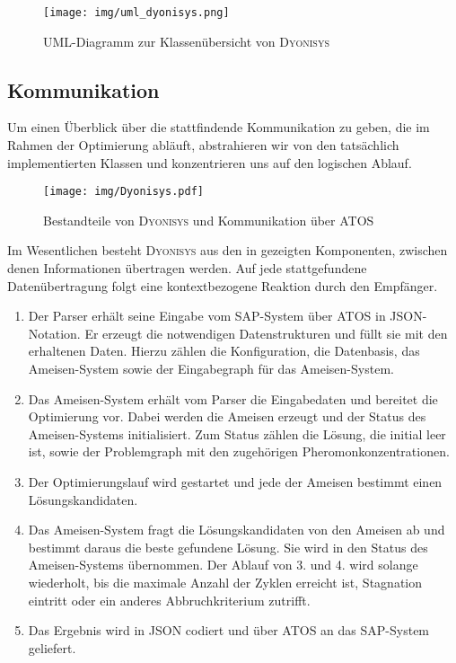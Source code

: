 \begin{figure}[h]
  \centering
  \texttt{[image: img/uml\_dyonisys.png]}
  \caption{UML-Diagramm zur Klassenübersicht von \textsc{Dyonisys}}
  \label{fig:uml_dyonisys}
\end{figure}


\subsection{Kommunikation}
Um einen Überblick über die stattfindende Kommunikation zu geben, die im Rahmen der Optimierung abläuft, abstrahieren wir von den tatsächlich implementierten Klassen und konzentrieren uns auf den logischen Ablauf. \\

\begin{wrapfigure}{r}{0.52\textwidth}
  \vspace{-30pt}
  \begin{center}
    \texttt{[image: img/Dyonisys.pdf]}
  \end{center}
  \vspace{-20pt}
  \caption{Bestandteile von \textsc{Dyonisys} und Kommunikation über \textsc{ATOS}}
  \label{fig:dyonisys}
 \vspace{-10pt}
\end{wrapfigure}

\noindent
Im Wesentlichen besteht \textsc{Dyonisys} aus den in  gezeigten Komponenten, zwischen denen Informationen übertragen werden. Auf jede stattgefundene Datenübertragung folgt eine kontextbezogene Reaktion durch den Empfänger. \\

\begin{enumerate}
  \item Der Parser erhält seine Eingabe vom SAP-System über \textsc{ATOS} in \textsc{JSON}-Notation. Er erzeugt die notwendigen Datenstrukturen und füllt sie mit den erhaltenen Daten. Hierzu zählen die Konfiguration, die Datenbasis, das Ameisen-System sowie der Eingabegraph für das Ameisen-System.
  \item Das Ameisen-System erhält vom Parser die Eingabedaten und bereitet die Optimierung vor. Dabei werden die Ameisen erzeugt und der Status des Ameisen-Systems initialisiert. Zum Status zählen die Lösung, die initial leer ist, sowie der Problemgraph mit den zugehörigen Pheromonkonzentrationen.
  \item Der Optimierungslauf wird gestartet und jede der Ameisen bestimmt einen Lösungskandidaten.
  \item Das Ameisen-System fragt die Lösungskandidaten von den Ameisen ab und bestimmt daraus die beste gefundene Lösung. Sie wird in den Status des Ameisen-Systems übernommen. Der Ablauf von 3. und 4. wird solange wiederholt, bis die maximale Anzahl der Zyklen erreicht ist, Stagnation eintritt oder ein anderes Abbruchkriterium zutrifft.
  \item Das Ergebnis wird in \textsc{JSON} codiert und über \textsc{ATOS} an das SAP-System geliefert.
\end{enumerate}


